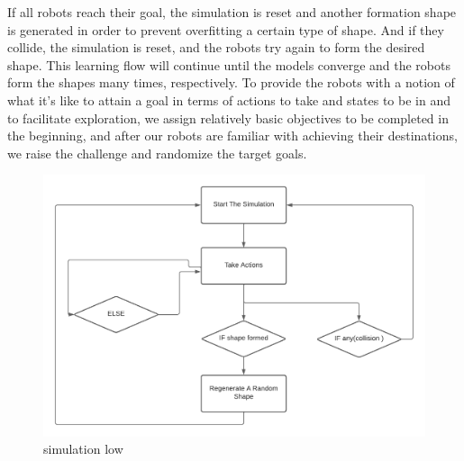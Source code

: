 \documentclass[12pt]{extarticle}
\begin{document}
If all robots reach their goal, the simulation is reset and another formation shape is generated in order to prevent overfitting a certain type of shape.
And if they collide, the simulation is reset, and the robots try again to form the desired shape.
This learning flow will continue until the models converge and the robots form the shapes many times, respectively.
To provide the robots with a notion of what it's like to attain a goal in terms of actions to take and states to be in and to facilitate exploration, we assign relatively basic objectives to be completed in the beginning, and after our robots are familiar with achieving their destinations, we raise the challenge and randomize the target goals.


 \begin{figure}[h]  
\centering
\includegraphics[scale=0.85]{simulation_flow}
\caption[simulation flow]{simulation low}
\end{figure}
\end{document}
